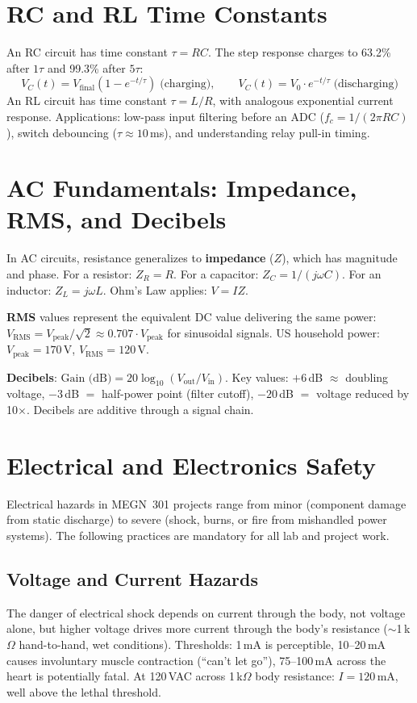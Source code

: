 \section{RC and RL Time Constants}

An RC circuit has time constant $\tau = RC$. The step response charges to 63.2\% after $1\tau$ and 99.3\% after $5\tau$:
\begin{equation}
V_C(t) = V_{\text{final}}\left(1 - e^{-t/\tau}\right) \;\text{(charging)}, \qquad V_C(t) = V_0 \cdot e^{-t/\tau} \;\text{(discharging)}
\end{equation}
An RL circuit has time constant $\tau = L/R$, with analogous exponential current response. Applications: low-pass input filtering before an ADC ($f_c = 1/(2\pi RC)$), switch debouncing ($\tau \approx 10$\,ms), and understanding relay pull-in timing.


\section{AC Fundamentals: Impedance, RMS, and Decibels}

In AC circuits, resistance generalizes to \textbf{impedance} ($Z$), which has magnitude and phase. For a resistor: $Z_R = R$. For a capacitor: $Z_C = 1/(j\omega C)$. For an inductor: $Z_L = j\omega L$. Ohm's Law applies: $V = IZ$.

\textbf{RMS} values represent the equivalent DC value delivering the same power: $V_{\text{RMS}} = V_{\text{peak}}/\sqrt{2} \approx 0.707 \cdot V_{\text{peak}}$ for sinusoidal signals. US household power: $V_{\text{peak}} = 170$\,V, $V_{\text{RMS}} = 120$\,V.

\textbf{Decibels}: $\text{Gain (dB)} = 20\log_{10}(V_{\text{out}}/V_{\text{in}})$. Key values: $+6$\,dB $\approx$ doubling voltage, $-3$\,dB $=$ half-power point (filter cutoff), $-20$\,dB $=$ voltage reduced by 10$\times$. Decibels are additive through a signal chain.


\section{Electrical and Electronics Safety}

Electrical hazards in MEGN~301 projects range from minor (component damage from static discharge) to severe (shock, burns, or fire from mishandled power systems). The following practices are mandatory for all lab and project work.

\subsection{Voltage and Current Hazards}
The danger of electrical shock depends on current through the body, not voltage alone, but higher voltage drives more current through the body's resistance ($\sim$1\,k$\Omega$ hand-to-hand, wet conditions). Thresholds: 1\,mA is perceptible, 10--20\,mA causes involuntary muscle contraction (``can't let go''), 75--100\,mA across the heart is potentially fatal. At 120\,VAC across 1\,k$\Omega$ body resistance: $I = 120$\,mA, well above the lethal threshold.

